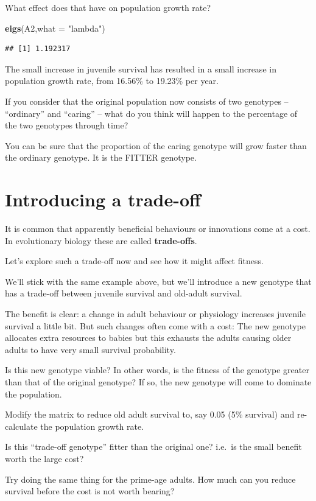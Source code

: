 \documentclass[
  a4paper]{book}
\newenvironment{Shaded}{\begin{snugshade}}{\end{snugshade}}
\newcommand{\AttributeTok}[1]{\textcolor[rgb]{0.13,0.29,0.53}{#1}}
\newcommand{\FunctionTok}[1]{\textcolor[rgb]{0.13,0.29,0.53}{\textbf{#1}}}
\newcommand{\NormalTok}[1]{#1}
\newcommand{\StringTok}[1]{\textcolor[rgb]{0.31,0.60,0.02}{#1}}
\begin{document}
What effect does that have on population growth rate?

\begin{Shaded}
\begin{Highlighting}[]
\FunctionTok{eigs}\NormalTok{(A2,}\AttributeTok{what =} \StringTok{"lambda"}\NormalTok{)}
\end{Highlighting}
\end{Shaded}

\begin{verbatim}
## [1] 1.192317
\end{verbatim}

The small increase in juvenile survival has resulted in a small increase in population growth rate, from 16.56\% to 19.23\% per year.

If you consider that the original population now consists of two genotypes -- ``ordinary'' and ``caring'' -- what do you think will happen to the percentage of the two genotypes through time?

You can be sure that the proportion of the caring genotype will grow faster than the ordinary genotype. It is the FITTER genotype.

\hypertarget{introducing-a-trade-off}{%
\section{Introducing a trade-off}\label{introducing-a-trade-off}}

It is common that apparently beneficial behaviours or innovations come at a cost. In evolutionary biology these are called \textbf{trade-offs}.

Let's explore such a trade-off now and see how it might affect fitness.

We'll stick with the same example above, but we'll introduce a new genotype that has a trade-off between juvenile survival and old-adult survival.

The benefit is clear: a change in adult behaviour or physiology increases juvenile survival a little bit.
But such changes often come with a cost: The new genotype allocates extra resources to babies but this exhausts the adults causing older adults to have very small survival probability.

Is this new genotype viable? In other words, is the fitness of the genotype greater than that of the original genotype? If so, the new genotype will come to dominate the population.

\begin{do-something}
Modify the matrix to reduce old adult survival to, say 0.05 (5\%
survival) and re-calculate the population growth rate.

Is this ``trade-off genotype'' fitter than the original one? i.e.~is the
small benefit worth the large cost?

Try doing the same thing for the prime-age adults. How much can you
reduce survival before the cost is not worth bearing?
\end{do-something}
\end{document}
